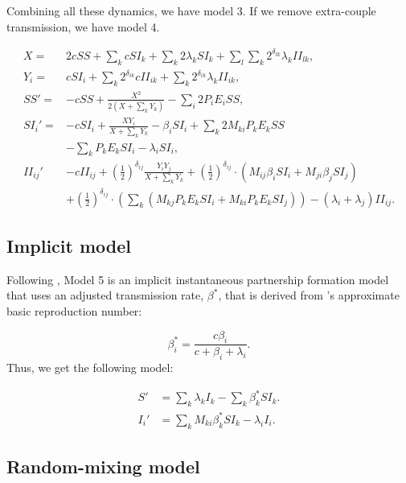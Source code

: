 \documentclass[10pt,letterpaper]{article}
\newcommand{\khalf}{\left(\frac{1}{2}\right)^{\delta_{ij}}}  %
\begin{document}
Combining all these dynamics, we have model 3. If we remove extra-couple transmission, we have model 4.

\begin{equation}
\begin{aligned}
X =& 2 c SS + \sum_k c SI_k + \sum_k 2 \lambda_k SI_k + \sum_l \sum_k 2^{\delta_{lk}}  \lambda_k II_{lk},\\
Y_i =& c SI_i + \sum_k 2^{\delta_{ik}}  c II_{ik} + \sum_k  2^{\delta_{ik}}  \lambda_k II_{ik}, \\
SS'  =& - c SS + \frac{X^2}{2 (X + \sum_k Y_k)}  - \sum_i 2 P_i E_i SS,\\
SI_i' =& - c SI_i + \frac{X Y_i}{X + \sum_k Y_k} - \beta_i SI_i + \sum_k 2 M_{ki} P_k E_k SS\\
&- \sum_k P_k E_k SI_i - \lambda_i SI_i,\\
II_{ij}'& - c II_{ij} +\khalf \frac{Y_i Y_j}{X + \sum_k Y_k} + \khalf \cdot (M_{ij} \beta_i SI_i + M_{ji} \beta_j SI_j)\\
&+ \khalf \cdot (\sum_k (M_{kj} P_k E_k SI_i + M_{ki} P_k E_k SI_j)) -(\lambda_i + \lambda_j) II_{ij}.
\end{aligned}
\end{equation}

\subsection*{Implicit model}

Following \cite{shirreff_transmission_2011}, Model 5 is an implicit instantaneous partnership formation model that uses an adjusted transmission rate, $\beta^\ast$, that is derived from \cite{hollingsworth_hiv1_2008}'s approximate basic reproduction number:

\begin{equation}
\beta^\ast_i = \frac{c \beta_i}{c + \beta_i + \lambda_i}.
\end{equation}
Thus, we get the following model:

\begin{equation}
\begin{aligned}
S' & = \sum_k \lambda_k I_k - \sum_k \beta^\ast_k S I_k.\\
I_i' & = \sum_k M_{ki} \beta^\ast_k S I_k - \lambda_i I_i.
\end{aligned}
\end{equation}

\subsection*{Random-mixing model}
\end{document}

